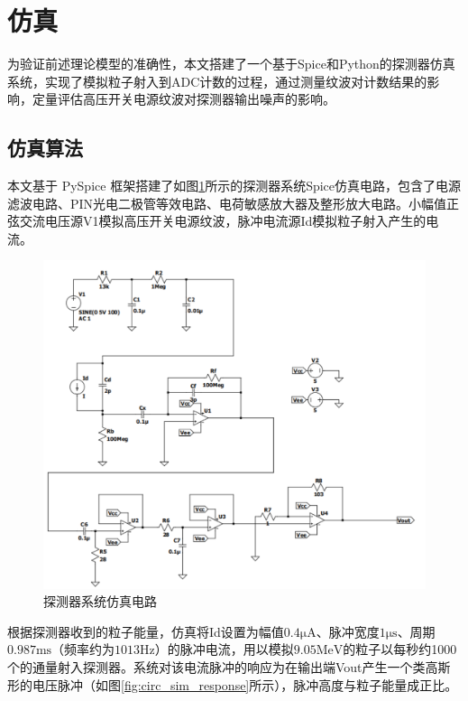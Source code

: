 \documentclass[twocolumn]{ctexart}
\begin{document}
\section{仿真}

为验证前述理论模型的准确性，本文搭建了一个基于Spice和Python的探测器仿真系统，实现了模拟粒子射入到ADC计数的过程，通过测量纹波对计数结果的影响，定量评估高压开关电源纹波对探测器输出噪声的影响。

\subsection{仿真算法}

本文基于 PySpice 框架搭建了如图\ref{fig:circ_sim}所示的探测器系统Spice仿真电路，包含了电源滤波电路、PIN光电二极管等效电路、电荷敏感放大器及整形放大电路。小幅值正弦交流电压源V1模拟高压开关电源纹波，脉冲电流源Id模拟粒子射入产生的电流。

\begin{figure}[htbp]
    \centering
    \includegraphics[width=\linewidth]{./circ_sim.png}
    \caption{探测器系统仿真电路}
    \label{fig:circ_sim}
\end{figure}

根据探测器收到的粒子能量，仿真将Id设置为幅值$0.4\mathrm{\mu A}$、脉冲宽度$1\mathrm{\mu s}$、周期$0.987\mathrm{ms}$（频率约为$1013\mathrm{Hz}$）的脉冲电流，用以模拟$9.05\mathrm{MeV}$的粒子以每秒约1000个的通量射入探测器。系统对该电流脉冲的响应为在输出端Vout产生一个类高斯形的电压脉冲（如图\ref{fig:circ_sim_response}所示），脉冲高度与粒子能量成正比。
\end{document}
